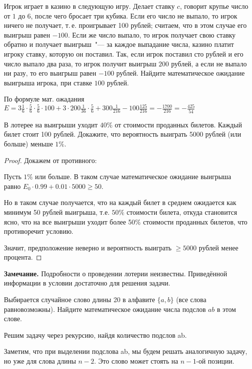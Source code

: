 \documentclass[12pt]{extreport}
\theoremstyle{definiton}
\theoremstyle{definition}
\theoremstyle{definition}
\let\geq\geqslant
\newcounter{problem}
\newcounter{subproblem}
\def\beforPRskip{
	\bigskip
}
\def\pr{\beforPRskip\noindent\stepcounter{problem}{\bf \theproblem .\;}\setcounter{subproblem}{0}}
\begin{document}
	


\pr  Игрок играет в казино в следующую игру. Делает ставку $c$, говорит крупье число от $1$ до $6$, после чего бросает три кубика. Если его число не выпало, то игрок ничего не получает, т.\,е. проигрывает 100 рублей; считаем, что в этом случае его выигрыш равен $-100$. Если же число выпало, то игрок получает свою ставку обратно и получает выигрыш~"--- за каждое выпадание числа, казино платит игроку ставку, которую он поставил. Так, если игрок поставил сто рублей и его число выпало два раза, то игрок получит выигрыш $200$ рублей, а если не выпало ни разу, то его выигрыш равен $-100$ рублей. Найдите математическое ожидание выигрыша игрока, при ставке $100$ рублей.

По формуле мат. ожадания $E = 3 \frac{1}{6} \cdot \frac{5}{6} \cdot \frac{5}{6} \cdot 100 + 3 \cdot 200 \frac{1}{36} \cdot \frac{5}{6} + 300 \frac{1}{216} - 100 \frac{125}{216} = - \frac{1700}{216} = - \frac{425}{54}$

  	\pr В лотерее на выигрыши уходит $40\%$ от стоимости проданных
	билетов. Каждый билет стоит 100 рублей. Докажите, что вероятность
	выиграть 5000 рублей (или больше) меньше $1\%$. 

	\begin{proof}
		Докажем от противного:

		Пусть $1\%$ или больше. В таком случае математическое ожидание выигрыша равно $E_0 \cdot 0.99 + 0.01 \cdot 5000 \ge 50.$
		
		Но в таком случае получается, что на каждый билет в среднем ожидается как минимум 50 рублей выигрыша, т.е. $50\%$ стоимости билета, откуда становится ясно,
		что на все выигрыши уходит более 50$\%$ стоимости проданных билетов, что противоречит условию. 
		
		Значит, предположение неверно и вероятность выиграть $\geq 5000$ рублей менее процента.

	\end{proof}

	\noindent\textbf{Замечание.} Подробности о проведении лотерии неизвестны. Приведённой информации в условии достаточно для решения задачи.

	\pr Выбирается случайное  слово длины 20 в алфавите $\{a,b\}$ (все
	слова равновозможны). Найдите математическое ожидание числа подслов
	$ab$ в этом слове.

	Решим задачу через рекурсию, найдя количество подслов ab. 

	Заметим, что при выделении подслова ab, мы будем решать аналогичную задачу, но уже для слова длины $n-2$. Это слово может стоять на $n-1$-ой позиции.
\end{document}
